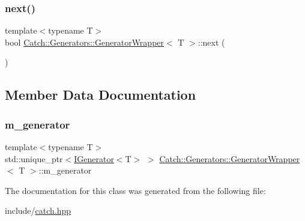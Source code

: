\subsubsection{\texorpdfstring{next()}{next()}}
{\footnotesize\ttfamily template$<$typename T$>$ \\
bool \mbox{\hyperlink{class_catch_1_1_generators_1_1_generator_wrapper}{Catch\+::\+Generators\+::\+Generator\+Wrapper}}$<$ T $>$\+::next (\begin{DoxyParamCaption}{ }\end{DoxyParamCaption})\hspace{0.3cm}{\ttfamily [inline]}}



\subsection{Member Data Documentation}
\mbox{\label{class_catch_1_1_generators_1_1_generator_wrapper_a8f35291599183b36e4c5af78e17d3a8c}} 
\subsubsection{\texorpdfstring{m\_generator}{m\_generator}}
{\footnotesize\ttfamily template$<$typename T$>$ \\
std\+::unique\+\_\+ptr$<$\mbox{\hyperlink{struct_catch_1_1_generators_1_1_i_generator}{I\+Generator}}$<$T$>$ $>$ \mbox{\hyperlink{class_catch_1_1_generators_1_1_generator_wrapper}{Catch\+::\+Generators\+::\+Generator\+Wrapper}}$<$ T $>$\+::m\+\_\+generator\hspace{0.3cm}{\ttfamily [private]}}



The documentation for this class was generated from the following file\+:\begin{DoxyCompactItemize}
\item 
include/\mbox{\hyperlink{catch_8hpp}{catch.\+hpp}}\end{DoxyCompactItemize}
